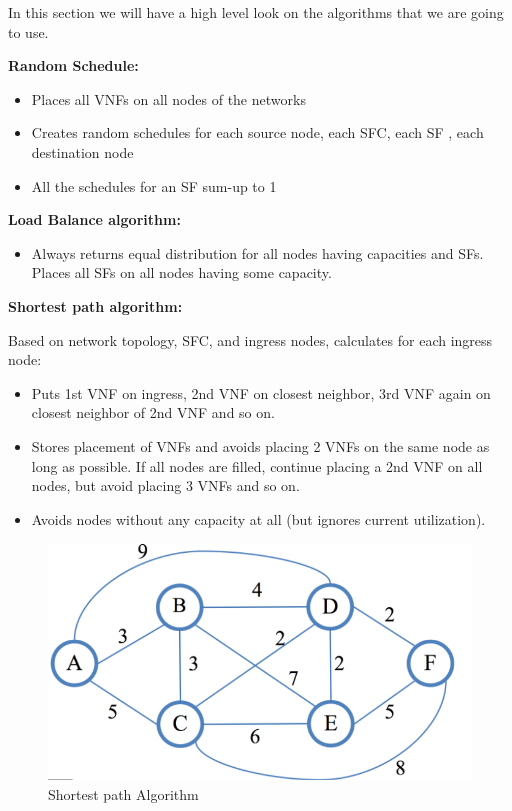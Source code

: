 In this section we will have a high level look on the algorithms that we are going to use.

\textbf{Random Schedule:}

\begin{itemize}

\item Places all VNFs on all nodes of the networks

\item Creates random schedules for each source node, each SFC, each SF , each destination node

\item All the schedules for an SF sum-up to 1

\end{itemize}


\textbf{Load Balance algorithm:}

\begin{itemize}

\item Always returns equal distribution for all nodes having capacities and SFs. Places all SFs on all nodes having some capacity.

\end{itemize}

\textbf{Shortest path algorithm:}

Based on network topology, SFC, and ingress nodes, calculates for each ingress node:
\begin{itemize}

\item Puts 1st VNF on ingress, 2nd VNF on closest neighbor, 3rd VNF again on closest neighbor of 2nd VNF and so on.

\item Stores placement of VNFs and avoids placing 2 VNFs on the same node as long as possible. If all nodes are filled, continue placing a 2nd VNF on all nodes, but avoid placing 3 VNFs and so on.

\item Avoids nodes without any capacity at all (but ignores current utilization).

\end{itemize}

\begin{figure}[h]
    \centering
    \includegraphics[width=1\textwidth]{shortesth path}
    \caption{Shortest path Algorithm}
    \label{fig:shortesth path}
\end{figure}